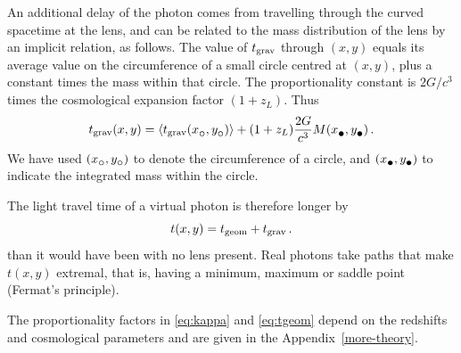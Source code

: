 An additional delay of the photon comes from travelling through the
curved spacetime at the lens, and can be related to the mass
distribution of the lens by an implicit relation, as follows.  The
value of $t_{\rm grav}$ through $(x,y)$ equals its average value on the
circumference of a small circle centred at $(x,y)$, plus a constant
times the mass within that circle.  The proportionality constant is
$2G/c^3$ times the cosmological expansion factor $(1+z_L)$. Thus
\begin{equation} \label{eq:tgrav}
\tgrav(x,y) = \left\langle \tgrav(x_\subcirc,y_\subcirc) \right\rangle
              + (1+z_L) \frac{2G}{c^3} M(x_\subbullet,y_\subbullet) \,.
\end{equation}
We have used $(x_\subcirc,y_\subcirc)$ to denote the circumference of
a circle, and $(x_\subbullet,y_\subbullet)$ to indicate the integrated
mass within the circle.

The light travel time of a virtual photon is therefore longer by
\begin{equation}  \label{eq:tarriv}
t(x,y) = t_{\rm geom} + t_{\rm grav} \,.
\end{equation}
than it would have been with no lens present.  Real photons take paths
that make $t(x,y)$ extremal, that is, having a minimum, maximum or
saddle point (Fermat's principle).

The proportionality factors in \eqref{eq:kappa} and \eqref{eq:tgeom}
depend on the redshifts and cosmological parameters and are given in
the Appendix~\ref{more-theory}.

